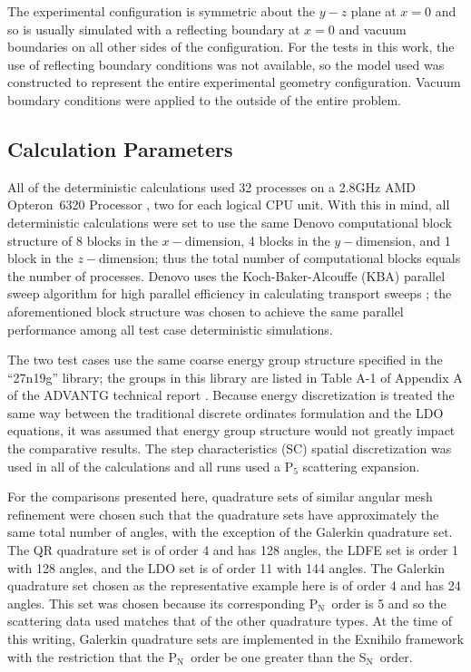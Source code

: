\documentclass{article} %
\newcommand{\sn}{S$_\mathrm{N}$}
\newcommand{\pn}{P$_\mathrm{N}$}
\begin{document}
The experimental configuration is symmetric about the $y-z$ plane at $x = 0$
and so is usually simulated with a reflecting boundary at $x = 0$ and vacuum
boundaries on all other sides of the configuration. For the tests in this work,
the use of reflecting boundary conditions was not available, so the model used 
was constructed to represent the entire experimental geometry configuration.
Vacuum boundary conditions were applied to the outside of the entire problem.

\subsection{Calculation Parameters}

All of the deterministic calculations used 32 processes on a 2.8GHz AMD 
Opteron\texttrademark\ 6320 Processor \cite{amd}, two for each logical CPU
unit. With this in mind, all deterministic calculations were set to use the
same Denovo computational block structure of 8 blocks 
in the $x-$dimension, 4 blocks in the $y-$dimension, and 1 block in the 
$z-$dimension; thus the total number of computational blocks equals the number
of processes. Denovo uses the Koch-Baker-Alcouffe (KBA) parallel sweep
algorithm for high parallel efficiency in calculating transport sweeps
\cite{denovo}; the aforementioned block structure was chosen to achieve the
same parallel performance among all test case deterministic simulations. 

The two test cases use the same coarse energy group structure specified in 
the ``27n19g'' library; the groups in this library are listed in Table A-1 of
Appendix A of the ADVANTG technical report \cite{advantg}. Because 
energy discretization is treated the same way between the traditional discrete
ordinates formulation and the LDO equations, it was assumed that energy group 
structure would not greatly impact the comparative results.
The step characteristics (SC) spatial discretization was used in all of the
calculations and all runs used a P$_5$ scattering expansion.

For the comparisons presented here, quadrature sets of similar angular mesh
refinement were chosen such that the quadrature sets have approximately the 
same total number of angles, with the exception of the Galerkin quadrature set.
The QR quadrature set is of order 4 and has 128 angles, the LDFE set is order 1
with 128 angles, and the LDO set is of order 11 with 144 angles. 
The Galerkin quadrature set chosen as the representative example here is of
order 4 and has 24 angles. This set was chosen because its corresponding \pn\
order is 5 and so the scattering data used matches that of the other quadrature
types. At the time of this writing, Galerkin quadrature sets are implemented in
the Exnihilo framework with the restriction that the \pn\ order be one greater
than the \sn\ order.
\end{document}
